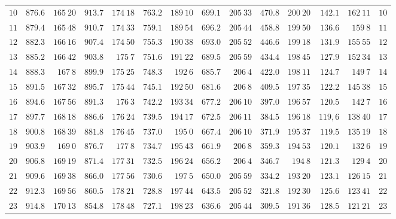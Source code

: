\begin{center}
\begin{tabular}{r|r|r|r|r|r|r|r|r|r|r|r|r|r}
$10$ & $876.6$ & $165\ 20$ & $913.7$ & $174\ 18$ & $763.2$ & $189\ 10$ & $699.1$ & $205\ 33$ & $470.8$ & $200\ 20$ & $142.1$ & $162\ 11$ & $10$ \\[3pt]
$11$ & $879.4$ & $165\ 48$ & $910.7$ & $174\ 33$ & $759.1$ & $189\ 54$ & $696.2$ & $205\ 44$ & $458.8$ & $199\ 50$ & $136.6$ & $159\ 8$ & $11$ \\
$12$ & $882.3$ & $166\ 16$ & $907.4$ & $174\ 50$ & $755.3$ & $190\ 38$ & $693.0$ & $205\ 52$ & $446.6$ & $199\ 18$ & $131.9$ & $155\ 55$ & $12$ \\
$13$ & $885.2$ & $166\ 42$ & $903.8$ & $175\ 7$ & $751.6$ & $191\ 22$ & $689.5$ & $205\ 59$ & $434.4$ & $198\ 45$ & $127.9$ & $152\ 34$ & $13$ \\
$14$ & $888.3$ & $167\ 8$ & $899.9$ & $175\ 25$ & $748.3$ & $192\ 6$ & $685.7$ & $206\ 4$ & $422.0$ & $198\ 11$ & $124.7$ & $149\ 7$ & $14$ \\
$15$ & $891.5$ & $167\ 32$ & $895.7$ & $175\ 44$ & $745.1$ & $192\ 50$ & $681.6$ & $206\ 8$ & $409.5$ & $197\ 35$ & $122.2$ & $145\ 38$ & $15$ \\[3pt]
$16$ & $894.6$ & $167\ 56$ & $891.3$ & $176\ 3$ & $742.2$ & $193\ 34$ & $677.2$ & $206\ 10$ & $397.0$ & $196\ 57$ & $120.5$ & $142\ 7$ & $16$ \\
$17$ & $897.7$ & $168\ 18$ & $886.6$ & $176\ 24$ & $739.5$ & $194\ 17$ & $672.5$ & $206\ 11$ & $384.5$ & $196\ 18$ & $119{,}6$ & $138\ 40$ & $17$ \\
$18$ & $900.8$ & $168\ 39$ & $881.8$ & $176\ 45$ & $737.0$ & $195\ 0$ & $667.4$ & $206\ 10$ & $371.9$ & $195\ 37$ & $119.5$ & $135\ 19$ & $18$ \\
$19$ & $903.9$ & $169\ 0$ & $876.7$ & $177\ 8$ & $734.7$ & $195\ 43$ & $661.9$ & $206\ 8$ & $359.3$ & $194\ 53$ & $120.1$ & $132\ 6$ & $19$ \\
$20$ & $906.8$ & $169\ 19$ & $871.4$ & $177\ 31$ & $732.5$ & $196\ 24$ & $656.2$ & $206\ 4$ & $346.7$ & $194\ 8$ & $121.3$ & $129\ 4$ & $20$ \\[3pt]
$21$ & $909.6$ & $169\ 38$ & $866.0$ & $177\ 56$ & $730.6$ & $197\ 5$ & $650.0$ & $205\ 59$ & $334.2$ & $193\ 20$ & $123.1$ & $126\ 15$ & $21$ \\
$22$ & $912.3$ & $169\ 56$ & $860.5$ & $178\ 21$ & $728.8$ & $197\ 44$ & $643.5$ & $205\ 52$ & $321.8$ & $192\ 30$ & $125.6$ & $123\ 41$ & $22$ \\
$23$ & $914.8$ & $170\ 13$ & $854.8$ & $178\ 48$ & $727.1$ & $198\ 23$ & $636.6$ & $205\ 44$ & $309.5$ & $191\ 36$ & $128.5$ & $121\ 21$ & $23$ \\

\end{tabular}
\end{center}
